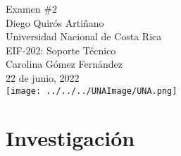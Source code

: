 \documentclass[stu, 12pt, letterpaper, donotrepeattitle, floatsintext, natbib, helv]{apa7}
\begin{document}
\begin{titlepage}
    \centering
    \vfill
    \LARGE Examen \#2\\
    \vskip2cm
    \large Diego Quirós Artiñano \\
    Universidad Nacional de Costa Rica \\
    EIF-202: Soporte Técnico \\ 
    Carolina Gómez Fernández \\
    22 de junio, 2022 \\
    \vfill
    \texttt{[image: ../../../UNAImage/UNA.png]} \\
    \vfill
    \vfill
\end{titlepage}

\addto{}
\tableofcontents
\setcounter{tocdepth}{2}
\newpage









\section*{Investigación}
{}
\end{document}
